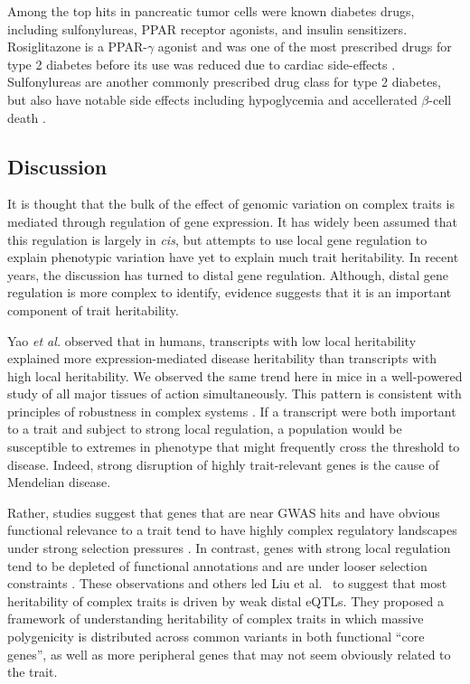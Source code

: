 \documentclass[
]{article}
\begin{document}
Among the top hits in pancreatic tumor cells were known diabetes drugs,
including sulfonylureas, PPAR receptor agonists, and insulin
sensitizers. Rosiglitazone is a PPAR-\(\gamma\) agonist and was one of
the most prescribed drugs for type 2 diabetes before its use was reduced
due to cardiac side-effects \cite{pmid21190462}. Sulfonylureas are
another commonly prescribed drug class for type 2 diabetes, but also
have notable side effects including hypoglycemia and accellerated
\(\beta\)-cell death \cite{pmid16631807}.

\subsection{Discussion}\label{discussion}

It is thought that the bulk of the effect of genomic variation on
complex traits is mediated through regulation of gene expression. It has
widely been assumed that this regulation is largely in \textit{cis}, but
attempts to use local gene regulation to explain phenotypic variation
have yet to explain much trait heritability. In recent years, the
discussion has turned to distal gene regulation. Although, distal gene
regulation is more complex to identify, evidence suggests that it is an
important component of trait heritability.

Yao \textit{et al.} \cite{pmid32424349} observed that in humans,
transcripts with low local heritability explained more
expression-mediated disease heritability than transcripts with high
local heritability. We observed the same trend here in mice in a
well-powered study of all major tissues of action simultaneously. This
pattern is consistent with principles of robustness in complex systems
\cite{pmid29782925, pmid12082173, pmid27304973}. If a transcript were
both important to a trait and subject to strong local regulation, a
population would be susceptible to extremes in phenotype that might
frequently cross the threshold to disease. Indeed, strong disruption of
highly trait-relevant genes is the cause of Mendelian disease.

Rather, studies suggest that genes that are near GWAS hits and have
obvious functional relevance to a trait tend to have highly complex
regulatory landscapes under strong selection pressures
\cite{pmid37857933}. In contrast, genes with strong local regulation
tend to be depleted of functional annotations and are under looser
selection constraints \cite{pmid37857933}. These observations and others
led Liu et al.~\cite{pmid31051098} to suggest that most heritability of
complex traits is driven by weak distal eQTLs. They proposed a framework
of understanding heritability of complex traits in which massive
polygenicity is distributed across common variants in both functional
``core genes'', as well as more peripheral genes that may not seem
obviously related to the trait.
\end{document}

